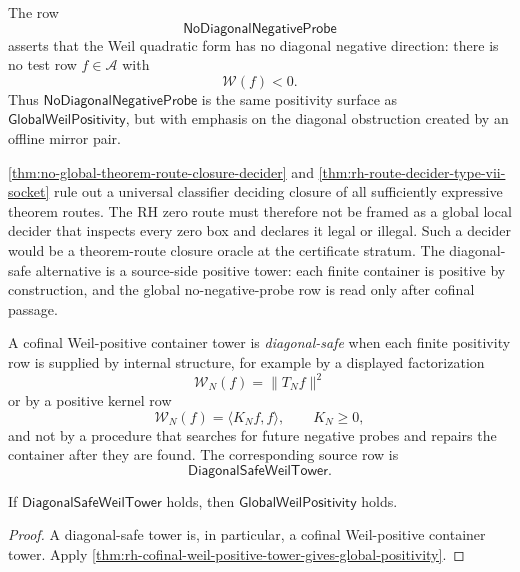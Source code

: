 \begin{definition}
\label{def:rh-no-diagonal-negative-probe}
The row
$$
\mathsf{NoDiagonalNegativeProbe}
$$
asserts that the Weil quadratic form has no diagonal negative direction:
there is no test row $f\in\mathcal A$ with
$$
\mathcal W(f)<0.
$$
Thus $\mathsf{NoDiagonalNegativeProbe}$ is the same positivity surface as
$\mathsf{GlobalWeilPositivity}$, but with emphasis on the diagonal
obstruction created by an offline mirror pair.
\end{definition}

\begin{principle}
\label{prin:rh-halting-boundary-forbids-local-closure-tests}
\autoref{thm:no-global-theorem-route-closure-decider} and
\autoref{thm:rh-route-decider-type-vii-socket} rule out a universal
classifier deciding closure of all sufficiently expressive theorem
routes.  The RH zero route must therefore not be framed as a global
local decider that inspects every zero box and declares it legal or
illegal.  Such a decider would be a theorem-route closure oracle at the
certificate stratum.  The diagonal-safe alternative is a source-side
positive tower: each finite container is positive by construction, and
the global no-negative-probe row is read only after cofinal passage.
\end{principle}

\begin{definition}
\label{def:rh-diagonal-safe-weil-tower}
A cofinal Weil-positive container tower is \emph{diagonal-safe} when
each finite positivity row is supplied by internal structure, for
example by a displayed factorization
$$
\mathcal W_N(f)=\|T_N f\|^2
$$
or by a positive kernel row
$$
\mathcal W_N(f)=\langle K_Nf,f\rangle,
\qquad
K_N\ge0,
$$
and not by a procedure that searches for future negative probes and
repairs the container after they are found.  The corresponding source
row is
$$
\mathsf{DiagonalSafeWeilTower}.
$$
\end{definition}

\begin{theorem}
\label{thm:rh-diagonal-safe-tower-gives-global-positivity}
If $\mathsf{DiagonalSafeWeilTower}$ holds, then
$\mathsf{GlobalWeilPositivity}$ holds.
\end{theorem}

\begin{proof}
A diagonal-safe tower is, in particular, a cofinal Weil-positive
container tower.  Apply
\autoref{thm:rh-cofinal-weil-positive-tower-gives-global-positivity}.
\end{proof}

